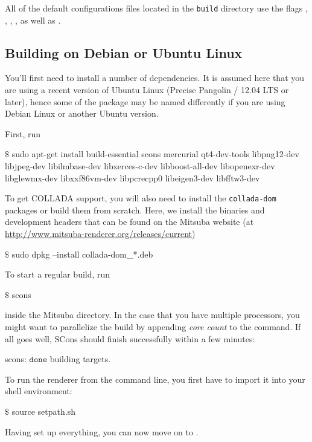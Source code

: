 All of the default configurations files located in the \texttt{build} directory use the flags
, , , ,
as well as .

\subsection{Building on Debian or Ubuntu Linux}
\label{sec:compiling-ubuntu}
You'll first need to install a number of dependencies. It is assumed here that you are using a
recent version of Ubuntu Linux (Precise Pangolin / 12.04 LTS or later), hence some of the
package may be named differently if you are using Debian Linux or another Ubuntu version.

First, run
\begin{shell}
$\text{\$}$ sudo apt-get install build-essential scons mercurial qt4-dev-tools libpng12-dev
    libjpeg-dev libilmbase-dev libxerces-c-dev libboost-all-dev libopenexr-dev
    libglewmx-dev libxxf86vm-dev libpcrecpp0 libeigen3-dev libfftw3-dev
\end{shell}
To get COLLADA support, you will also need to install the \texttt{collada-dom} packages
or build them from scratch. Here, we install the  binaries and development
headers that can be found on the Mitsuba website (at \url{http://www.mitsuba-renderer.org/releases/current})
\begin{shell}
$\text{\$}$ sudo dpkg --install collada-dom_*.deb
\end{shell}
To start a regular build, run
\begin{shell}
$\text{\$}$ scons
\end{shell}
inside the Mitsuba directory. In the case that you have multiple processors, you might want to parallelize the
build by appending \emph{core count} to the  command.
If all goes well, SCons should finish successfully within a few minutes:
\begin{shell}
scons: $\texttt{done}$ building targets.
\end{shell}
To run the renderer from the command line, you first have to import it into your shell environment:
\begin{shell}
$\text{\$}$ source setpath.sh
\end{shell}
Having set up everything, you can now move on to .
